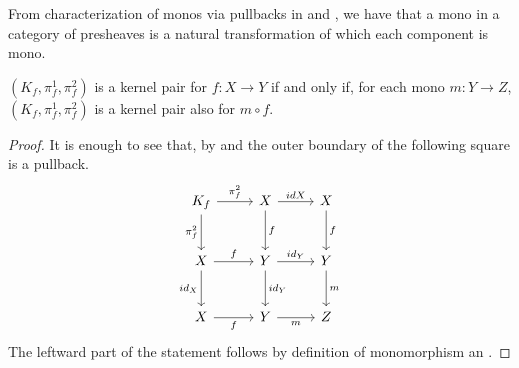 \documentclass[runningheads,envcountsect]{llncs}
\begin{document}
\begin{remark}\label{rem:monos_in_presh_cats}
    From characterization of monos via pullbacks in  and , we have that a mono in a category of presheaves is a natural transformation of which each component is mono.
\end{remark}

\begin{corollary}\label{cor:kermono}
	$(K_f, \pi_f^1, \pi_f^2)$ is a kernel pair for $f\colon X\to Y$ if and only if, for each mono $m\colon Y\to Z$, $(K_f, \pi_f^1, \pi_f^2)$ is a kernel pair also for $m\circ f$.
\end{corollary}
\begin{proof}
    It is enough to see that, by  and  the outer boundary of the following square is a pullback.
        \[\begin{tikzcd}[row sep=13 pt, column sep=13 pt]
    	{K_f} && X && X \\
    	\\
    	X && Y && Y \\
    	\\
    	X && Y && Z
    	\arrow["{\pi_f^2}", from=1-1, to=1-3]
    	\arrow["{\pi_f^2}"', from=1-1, to=3-1]
    	\arrow["{id{X}}", from=1-3, to=1-5]
    	\arrow["f", from=1-3, to=3-3]
    	\arrow["f", from=1-5, to=3-5]
    	\arrow["f", from=3-1, to=3-3]
    	\arrow["{id_X}"', from=3-1, to=5-1]
    	\arrow["{id_Y}", from=3-3, to=3-5]
    	\arrow["{id_Y}", from=3-3, to=5-3]
    	\arrow["m", from=3-5, to=5-5]
    	\arrow["f"', from=5-1, to=5-3]
    	\arrow["m"', from=5-3, to=5-5]
    \end{tikzcd}\]
    The leftward part of the statement follows by definition of monomorphism an .
\end{proof}
\end{document}
